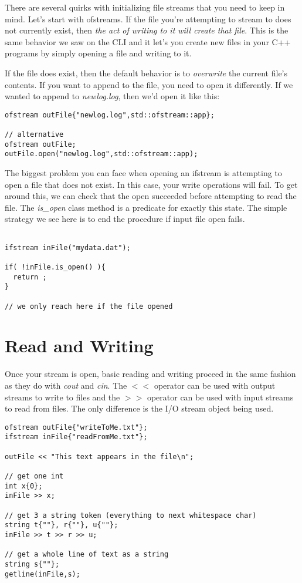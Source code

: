 \documentclass[]{tufte-handout}
\begin{document}
There are several quirks with initializing file streams that you need to keep in mind.  Let's start with ofstreams.  If the file you're attempting to stream to does not currently exist, then \textit{the act of writing to it will create that file}.  This is the same behavior we saw on the CLI and it let's you create new files in your C++ programs by simply opening a file and writing to it. 

If the file does exist, then the default behavior is to \textit{overwrite} the current file's contents.  If you want to append to the file, you need to open it differently. If we wanted to append to \textit{newlog.log}, then we'd open it like this:
\begin{verbatim}
ofstream outFile{"newlog.log",std::ofstream::app}; 

// alternative 
ofstream outFile;
outFile.open("newlog.log",std::ofstream::app);
\end{verbatim}

The biggest problem you can face when opening an ifstream is attempting to open a file that does not exist.  In this case, your write operations will fail. To get around this, we can check that the open succeeded before attempting to read the file. The \textit{is\_open} class method is a predicate for exactly this state.  The simple strategy we see here is to end the procedure if input file open fails.
\begin{verbatim}

ifstream inFile("mydata.dat");

if( !inFile.is_open() ){
  return ; 
}

// we only reach here if the file opened
\end{verbatim}


\section{Read and Writing}

Once your stream is open, basic reading and writing proceed in the same fashion as they do with \textit{cout} and \textit{cin}.  The $<<$ operator can be used with output streams to write to files and the $>>$ operator can be used with input streams to read from files. The only difference is the I/O stream object being used.
\begin{verbatim}
ofstream outFile{"writeToMe.txt"};
ifstream inFile{"readFromMe.txt"};

outFile << "This text appears in the file\n";

// get one int
int x{0};
inFile >> x;

// get 3 a string token (everything to next whitespace char)
string t{""}, r{""}, u{""};
inFile >> t >> r >> u;

// get a whole line of text as a string
string s{""};
getline(inFile,s);
\end{verbatim}
\end{document}
